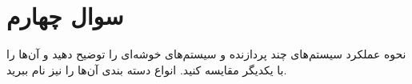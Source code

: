 \section{سوال چهارم}


نحوه عملکرد سیستم‌های چند پردازنده و سیستم‌های خوشه‌ای را توضیح دهید و آن‌ها را با یکدیگر مقایسه کنید. انواع دسته بندی آن‌ها را نیز نام ببرید.


\begin{qsolve}
	
\end{qsolve}

